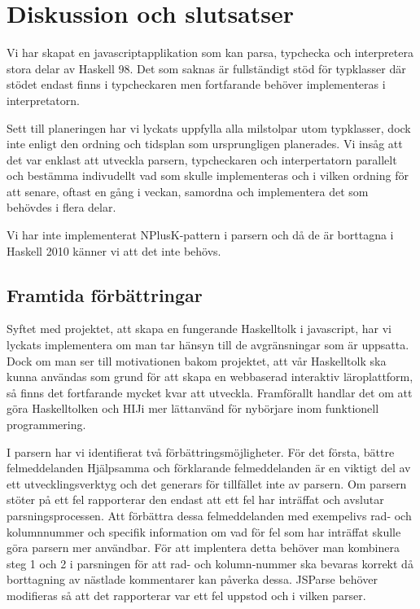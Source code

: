 \section{Diskussion och slutsatser}
Vi har skapat en javascriptapplikation som kan parsa, typchecka och interpretera stora delar av Haskell 98. Det som saknas är fullständigt stöd för typklasser där 
stödet endast finns i typcheckaren men fortfarande behöver implementeras i interpretatorn.

Sett till planeringen har vi lyckats uppfylla alla milstolpar utom typklasser, dock inte enligt den ordning och tidsplan som ursprungligen planerades. 
Vi insåg att det var enklast att utveckla parsern, typcheckaren och interpertatorn parallelt och bestämma indivudellt vad som skulle implementeras och i 
vilken ordning för att senare, oftast en gång i veckan, samordna och implementera det som behövdes i flera delar.

Vi har inte implementerat NPlusK-pattern i parsern och då de är borttagna i Haskell 2010 \citep{haskell2010} känner vi att det inte behövs.



\subsection{Framtida förbättringar}

Syftet med projektet, att skapa en fungerande Haskelltolk i javascript, har vi lyckats implementera om man tar hänsyn till de avgränsningar som är uppsatta. Dock om man ser till motivationen bakom projektet, att vår Haskelltolk ska kunna användas som grund för att skapa en webbaserad interaktiv läroplattform, så finns det fortfarande mycket kvar att utveckla. Framförallt handlar det om att göra Haskelltolken och HIJi mer lättanvänd för nybörjare inom funktionell programmering.

I parsern har vi identifierat två förbättringsmöjligheter. För det första, bättre felmeddelanden
Hjälpsamma och förklarande felmeddelanden är en viktigt del av ett utvecklingsverktyg och det generars för tillfället inte av parsern. 
Om parsern stöter på ett fel rapporterar den endast att ett fel har inträffat och avslutar parsningsprocessen. 
Att förbättra dessa felmeddelanden med exempelivs rad- och kolumnnummer och specifik information om vad för fel som har inträffat skulle göra parsern mer användbar.
För att implentera detta behöver man kombinera steg 1 och 2 i parsningen för att rad- och kolumn-nummer ska bevaras korrekt då borttagning av nästlade kommentarer kan påverka dessa.
JSParse behöver modifieras så att det rapporterar var ett fel uppstod och i vilken parser.

